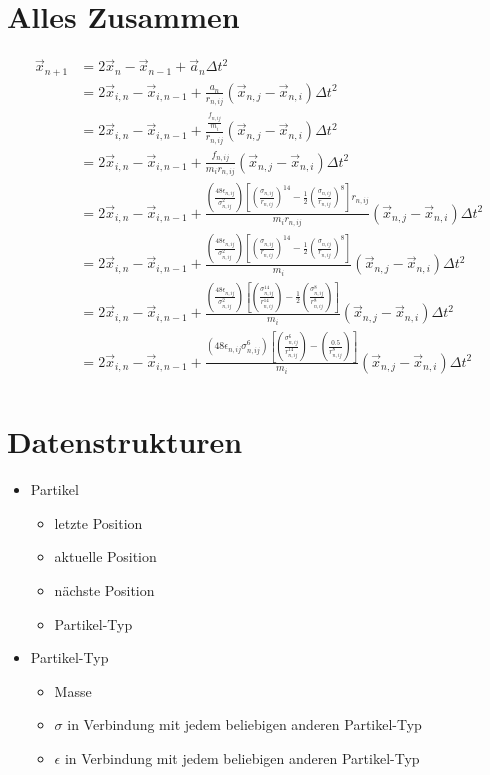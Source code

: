 \documentclass{article}
\begin{document}
\section*{Alles Zusammen}
\begin{align}
	\vec{x}_{n+1}&=2\vec{x}_n-\vec{x}_{n-1}+\vec{a}_n\Delta t^2\\
	&=2\vec{x}_{i,n}-\vec{x}_{i,n-1}+\frac{a_n}{r_{n,ij}}\left(\vec{x}_{n,j}-\vec{x}_{n,i}\right)\Delta t^2\\
	&=2\vec{x}_{i,n}-\vec{x}_{i,n-1}+\frac{\frac{f_{n,ij}}{m_i}}{r_{n,ij}}\left(\vec{x}_{n,j}-\vec{x}_{n,i}\right)\Delta t^2\\
	&=2\vec{x}_{i,n}-\vec{x}_{i,n-1}+\frac{f_{n,ij}}{m_ir_{n,ij}}\left(\vec{x}_{n,j}-\vec{x}_{n,i}\right)\Delta t^2\\
	&=2\vec{x}_{i,n}-\vec{x}_{i,n-1}+\frac{\left(\frac{48\epsilon_{n,ij}}{\sigma_{n,ij}^2}\right)\left[\left(\frac{\sigma_{n,ij}}{r_{n,ij}}\right)^{14}-\frac{1}{2}\left(\frac{\sigma_{n,ij}}{r_{n,ij}}\right)^8\right]r_{n,ij}}{m_ir_{n,ij}}\left(\vec{x}_{n,j}-\vec{x}_{n,i}\right)\Delta t^2\\
	&=2\vec{x}_{i,n}-\vec{x}_{i,n-1}+\frac{\left(\frac{48\epsilon_{n,ij}}{\sigma_{n,ij}^2}\right)\left[\left(\frac{\sigma_{n,ij}}{r_{n,ij}}\right)^{14}-\frac{1}{2}\left(\frac{\sigma_{n,ij}}{r_{n,ij}}\right)^8\right]}{m_i}\left(\vec{x}_{n,j}-\vec{x}_{n,i}\right)\Delta t^2\\
	&=2\vec{x}_{i,n}-\vec{x}_{i,n-1}+\frac{\left(\frac{48\epsilon_{n,ij}}{\sigma_{n,ij}^2}\right)\left[\left(\frac{\sigma_{n,ij}^{14}}{r_{n,ij}^{14}}\right)-\frac{1}{2}\left(\frac{\sigma_{n,ij}^8}{r_{n,ij}^8}\right)\right]}{m_i}\left(\vec{x}_{n,j}-\vec{x}_{n,i}\right)\Delta t^2\\
	&=2\vec{x}_{i,n}-\vec{x}_{i,n-1}+\frac{\left(48\epsilon_{n,ij}\sigma_{n,ij}^{6}\right)\left[\left(\frac{\sigma_{n,ij}^{6}}{r_{n,ij}^{14}}\right)-\left(\frac{0.5}{r_{n,ij}^8}\right)\right]}{m_i}\left(\vec{x}_{n,j}-\vec{x}_{n,i}\right)\Delta t^2\\
\end{align}


\section*{Datenstrukturen}
\begin{itemize}
	\item Partikel
	\begin{itemize}
		\item letzte     Position
		\item aktuelle Position
		\item nächste Position
		\item Partikel-Typ
	\end{itemize}
	\item Partikel-Typ
	\begin{itemize}
		\item Masse
		\item $\sigma$ in Verbindung mit jedem beliebigen anderen Partikel-Typ
		\item $\epsilon$ in Verbindung mit jedem beliebigen anderen Partikel-Typ
	\end{itemize}
\end{itemize}
\end{document}
